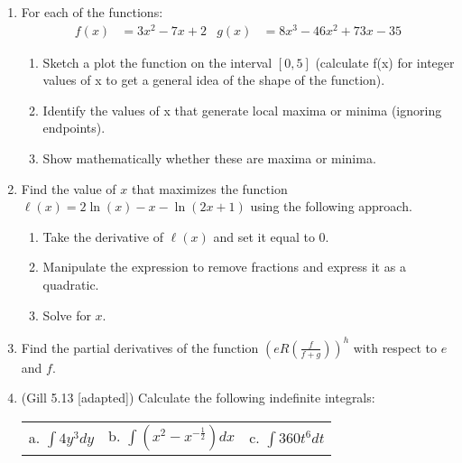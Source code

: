 \documentclass[11pt]{article}
\begin{document}
\begin{enumerate}
\vspace{.5cm}


\item For each of the functions:
\begin{align*}
f(x) &= 3x^2 - 7x + 2 &  g(x) &= 8x^3 - 46x^2 + 73x - 35
\end{align*}
\begin{enumerate}
\item Sketch a plot the function on the interval $[0,5]$ (calculate f(x) for integer values of x to get a general idea of the shape of the function).
\item Identify the values of x that generate local maxima or minima (ignoring endpoints).
\item Show mathematically whether these are maxima or minima.
\end{enumerate}

\vspace{.5cm}

\item Find the value of $x$ that maximizes the function $\ell(x) = 2\ln(x) - x - \ln(2x+1)$ using the following approach.
\begin{enumerate}
\item Take the derivative of $\ell(x)$ and set it equal to 0.
\item Manipulate the expression to remove fractions and express it as a quadratic.
\item Solve for $x$.
\end{enumerate}

\vspace{.5cm}

\item Find the partial derivatives of the function $(eR(\frac{f}{f+g}))^h$ with respect to $e$ and $f$.

\vspace{.5cm}


\item (Gill 5.13 [adapted]) Calculate the following indefinite integrals:
\begin{center}
\begin{tabular}{p{4cm}p{4cm}p{4cm}}
a. $\int 4y^3 dy$            &  b. $\int (x^2 - x^{-\frac{1}{2}}) dx$     & c.  $\int 360t^6 dt$         \rule{0cm}{1cm}\\
\end{tabular}
\end{center}


\end{enumerate}
\end{document}
